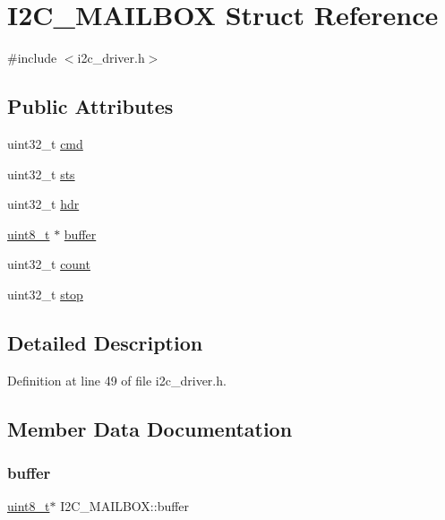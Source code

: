 \hypertarget{structI2C__MAILBOX}{}\section{I2\+C\+\_\+\+M\+A\+I\+L\+B\+OX Struct Reference}
\label{structI2C__MAILBOX}


{\ttfamily \#include $<$i2c\+\_\+driver.\+h$>$}

\subsection*{Public Attributes}
\begin{DoxyCompactItemize}
\item 
uint32\+\_\+t \mbox{\hyperlink{structI2C__MAILBOX_af89f3b197a3aeb8c2869c9dd39ffa378}{cmd}}
\item 
uint32\+\_\+t \mbox{\hyperlink{structI2C__MAILBOX_ace1f82d629413aece6f78bf81c0991f8}{sts}}
\item 
uint32\+\_\+t \mbox{\hyperlink{structI2C__MAILBOX_a84afe54cdce2b852d0c22d1b17e7fdc2}{hdr}}
\item 
\mbox{\hyperlink{stdint_8h_aba7bc1797add20fe3efdf37ced1182c5}{uint8\+\_\+t}} $\ast$ \mbox{\hyperlink{structI2C__MAILBOX_aeebd90e5c7f1db5cc1ce670eda901c5b}{buffer}}
\item 
uint32\+\_\+t \mbox{\hyperlink{structI2C__MAILBOX_ac228c1b2e5d0e1f4bc81aea46df398b1}{count}}
\item 
uint32\+\_\+t \mbox{\hyperlink{structI2C__MAILBOX_a7e1a620eee1be9c9745ebf836294570e}{stop}}
\end{DoxyCompactItemize}


\subsection{Detailed Description}


Definition at line 49 of file i2c\+\_\+driver.\+h.



\subsection{Member Data Documentation}
\mbox{\label{structI2C__MAILBOX_aeebd90e5c7f1db5cc1ce670eda901c5b}} 
\subsubsection{\texorpdfstring{buffer}{buffer}}
{\footnotesize\ttfamily \mbox{\hyperlink{stdint_8h_aba7bc1797add20fe3efdf37ced1182c5}{uint8\+\_\+t}}$\ast$ I2\+C\+\_\+\+M\+A\+I\+L\+B\+O\+X\+::buffer}



